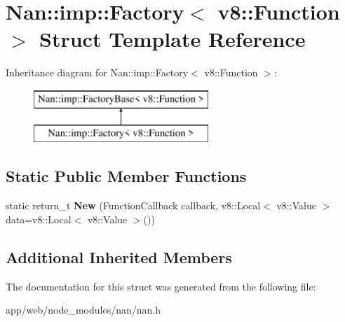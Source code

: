 \hypertarget{struct_nan_1_1imp_1_1_factory_3_01v8_1_1_function_01_4}{}\section{Nan\+:\+:imp\+:\+:Factory$<$ v8\+:\+:Function $>$ Struct Template Reference}
\label{struct_nan_1_1imp_1_1_factory_3_01v8_1_1_function_01_4}
Inheritance diagram for Nan\+:\+:imp\+:\+:Factory$<$ v8\+:\+:Function $>$\+:\begin{figure}[H]
\begin{center}
\leavevmode
\includegraphics[height=2.000000cm]{struct_nan_1_1imp_1_1_factory_3_01v8_1_1_function_01_4}
\end{center}
\end{figure}
\subsection*{Static Public Member Functions}
\begin{DoxyCompactItemize}
\item 
\mbox{\label{struct_nan_1_1imp_1_1_factory_3_01v8_1_1_function_01_4_aa9e52179042221f0410d81d10b62d712}} 
static return\+\_\+t {\bfseries New} (Function\+Callback callback, v8\+::\+Local$<$ v8\+::\+Value $>$ data=v8\+::\+Local$<$ v8\+::\+Value $>$())
\end{DoxyCompactItemize}
\subsection*{Additional Inherited Members}


The documentation for this struct was generated from the following file\+:\begin{DoxyCompactItemize}
\item 
app/web/node\+\_\+modules/nan/nan.\+h\end{DoxyCompactItemize}
